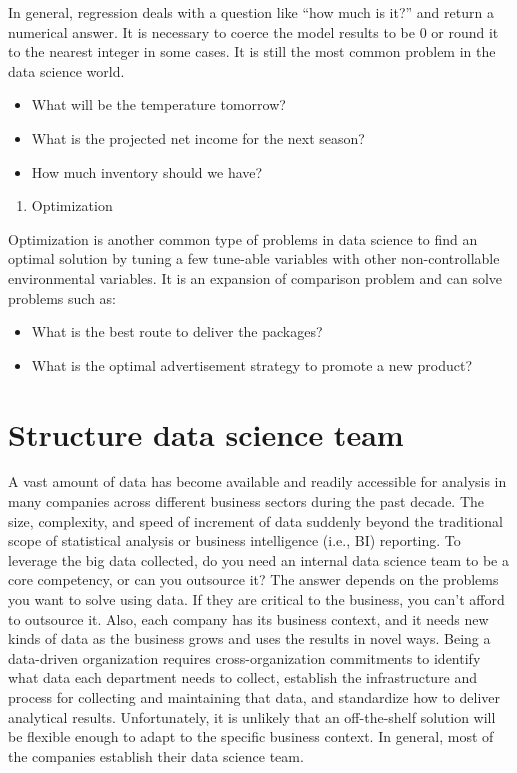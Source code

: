 \documentclass[
  12pt,
]{krantz}
\providecommand{\tightlist}{%
  \setlength{\itemsep}{0pt}\setlength{\parskip}{0pt}}
\begin{document}
In general, regression deals with a question like ``how much is it?'' and return a numerical answer. It is necessary to coerce the model results to be 0 or round it to the nearest integer in some cases. It is still the most common problem in the data science world.

\begin{itemize}
\tightlist
\item
  What will be the temperature tomorrow?
\item
  What is the projected net income for the next season?
\item
  How much inventory should we have?
\end{itemize}

\begin{enumerate}
\def\labelenumi{\arabic{enumi}.}
\setcounter{enumi}{5}
\tightlist
\item
  Optimization
\end{enumerate}

Optimization is another common type of problems in data science to find an optimal solution by tuning a few tune-able variables with other non-controllable environmental variables. It is an expansion of comparison problem and can solve problems such as:

\begin{itemize}
\tightlist
\item
  What is the best route to deliver the packages?
\item
  What is the optimal advertisement strategy to promote a new product?
\end{itemize}

\hypertarget{structure-data-science-team}{%
\section{Structure data science team}\label{structure-data-science-team}}

A vast amount of data has become available and readily accessible for analysis in many companies across different business sectors during the past decade. The size, complexity, and speed of increment of data suddenly beyond the traditional scope of statistical analysis or business intelligence (i.e., BI) reporting. To leverage the big data collected, do you need an internal data science team to be a core competency, or can you outsource it? The answer depends on the problems you want to solve using data. If they are critical to the business, you can't afford to outsource it. Also, each company has its business context, and it needs new kinds of data as the business grows and uses the results in novel ways. Being a data-driven organization requires cross-organization commitments to identify what data each department needs to collect, establish the infrastructure and process for collecting and maintaining that data, and standardize how to deliver analytical results. Unfortunately, it is unlikely that an off-the-shelf solution will be flexible enough to adapt to the specific business context. In general, most of the companies establish their data science team.
\end{document}
